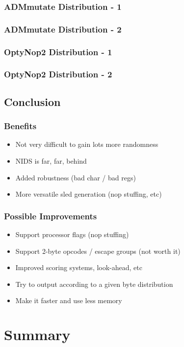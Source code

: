 \documentclass{beamer}
\newenvironment{sitemize}{\vspace{1mm}\begin{itemize}\itemsep 4pt}{\end{itemize}}
\begin{document}
\begin{frame}[fragile]
  \frametitle{ADMmutate Distribution - 1}
  
\end{frame}
\begin{frame}[fragile]
  \frametitle{ADMmutate Distribution - 2}
  
\end{frame}
\begin{frame}[fragile]
  \frametitle{OptyNop2 Distribution - 1}
  
\end{frame}
\begin{frame}[fragile]
  \frametitle{OptyNop2 Distribution - 2}
  
\end{frame}

\subsection{Conclusion}
\begin{frame}
  \frametitle{Benefits}
  \begin{sitemize}
    \item Not very difficult to gain lots more randomness
    \item NIDS is far, far, behind
    \item Added robustness (bad char / bad regs)
    \item More versatile sled generation (nop stuffing, etc)
  \end{sitemize}
\end{frame}
\begin{frame}
  \frametitle{Possible Improvements}
  \begin{sitemize}
    \item Support processor flags (nop stuffing)
    \item Support 2-byte opcodes / escape groups (not worth it)
    \item Improved scoring systems, look-ahead, etc
    \item Try to output according to a given byte distribution
    \item Make it faster and use less memory
  \end{sitemize}
\end{frame}


\section*{Summary}
\end{document}
